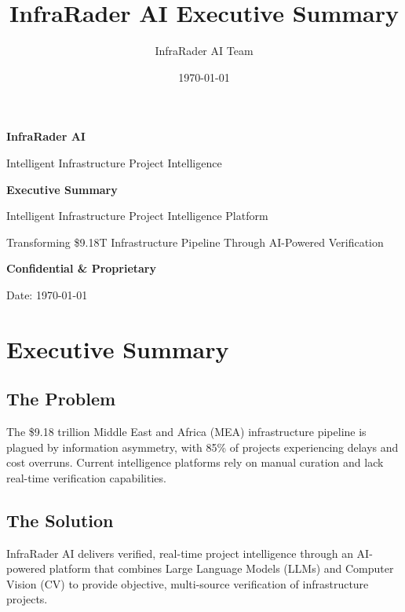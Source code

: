 \documentclass[executive]{../templates/infraradar-main}
\title{InfraRader AI Executive Summary}
\author{InfraRader AI Team}
\date{\today}
\begin{document}
\begin{titlepage}
    \centering
    \vspace*{2cm}
    
    {\Huge\bfseries\color{infraradar@primary} InfraRader AI\par}
    \vspace{0.5cm}
    {\Large\color{infraradar@text} Intelligent Infrastructure Project Intelligence\par}
    \vspace{2cm}
    
    {\huge\bfseries Executive Summary\par}
    \vspace{1cm}
    
    {\large Intelligent Infrastructure Project Intelligence Platform\par}
    \vspace{2cm}
    
    {\large Transforming \$9.18T Infrastructure Pipeline Through AI-Powered Verification\par}
    \vspace{3cm}
    
    {\large\bfseries\color{infraradar@primary} Confidential \& Proprietary\par}
    {\large Date: \today\par}
    
\end{titlepage}

\section*{Executive Summary}

\subsection*{The Problem}
The \$9.18 trillion Middle East and Africa (MEA) infrastructure pipeline is plagued by information asymmetry, with 85\% of projects experiencing delays and cost overruns. Current intelligence platforms rely on manual curation and lack real-time verification capabilities.

\subsection*{The Solution}
InfraRader AI delivers verified, real-time project intelligence through an AI-powered platform that combines Large Language Models (LLMs) and Computer Vision (CV) to provide objective, multi-source verification of infrastructure projects.
\end{document}
